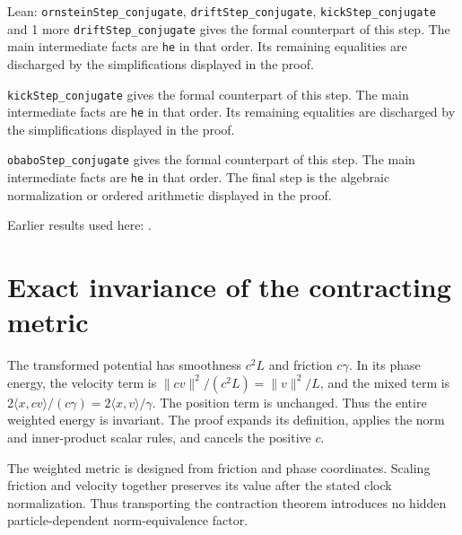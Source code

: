 \documentclass[11pt,a4paper]{article}
\begin{document}
\begin{leanbox}{Lean: \texttt{ornsteinStep\_\allowbreak{}conjugate}, \texttt{driftStep\_\allowbreak{}conjugate}, \texttt{kickStep\_\allowbreak{}conjugate} and 1 more}
\texttt{drift\allowbreak{}Step\_\allowbreak{}conjugate} gives the formal counterpart of this step. The main intermediate facts are \texttt{he} in that order. Its remaining equalities are discharged by the simplifications displayed in the proof.




\texttt{kick\allowbreak{}Step\_\allowbreak{}conjugate} gives the formal counterpart of this step. The main intermediate facts are \texttt{he} in that order. Its remaining equalities are discharged by the simplifications displayed in the proof.




\texttt{obabo\allowbreak{}Step\_\allowbreak{}conjugate} gives the formal counterpart of this step. The main intermediate facts are \texttt{he} in that order. The final step is the algebraic normalization or ordered arithmetic displayed in the proof.
\end{leanbox}


Earlier results used here: \cite[Section~3.20.1]{LangevinLean2026Kinetic}.

\section{\texorpdfstring{Exact invariance of the contracting metric}{Exact invariance of the contracting metric}}


The transformed potential has smoothness \(c^2L\) and friction \(c\gamma\). In its phase energy, the velocity term is \(\lVert cv\rVert^2/(c^2L)=\lVert v\rVert^2/L\), and the mixed term is \(2\langle x,cv\rangle/(c\gamma)=2\langle x,v\rangle/\gamma\). The position term is unchanged. Thus the entire weighted energy is invariant. The proof expands its definition, applies the norm and inner-product scalar rules, and cancels the positive \(c\).



The weighted metric is designed from friction and phase coordinates. Scaling friction and velocity together preserves its value after the stated clock normalization. Thus transporting the contraction theorem introduces no hidden particle-dependent norm-equivalence factor.
\end{document}
